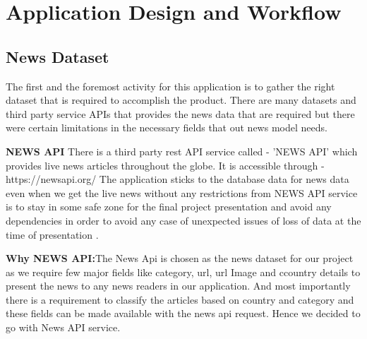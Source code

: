 \section {Application Design and Workflow}

\subsection{News Dataset}
The first and the foremost activity for this application is to gather the right dataset that is required to accomplish the product. There are many datasets and third party service APIs that provides the news data that are required but there were certain limitations in the necessary fields that out news model needs.

\textbf{\Large NEWS API}\newline
There is a third party rest API service called - 'NEWS API' which provides live news articles throughout the globe.
It is accessible through - https://newsapi.org/ \newline
The application sticks to the database data for news data even when we get the live news without any restrictions from NEWS API service is to stay in some safe zone for the final project presentation and avoid any dependencies in order to avoid any case of unexpected issues of loss of data at the time of presentation \cite{newsApi}.\newline

\textbf{Why NEWS API:}\newline The News Api is chosen as the news dataset for our project as we require few major fields like category, url, url Image and ccountry details to present the news to any news readers in our application.
And most importantly there is a requirement to classify the articles based on country and category and these fields can be made available with the news api request. Hence we decided to go with News API service. \newline

